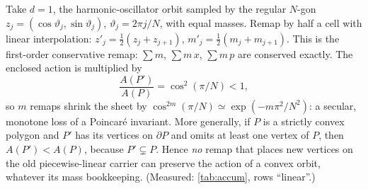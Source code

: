 \begin{counterexample}\label{cex:polygon}
Take $d=1$, the harmonic-oscillator orbit sampled by the regular $N$-gon $z_j=(\cos\vartheta_j,\sin\vartheta_j)$,
$\vartheta_j=2\pi j/N$, with equal masses. Remap by half a cell with linear interpolation:
$z'_j=\tfrac12(z_j+z_{j+1})$, $m'_j=\tfrac12(m_j+m_{j+1})$. This is the first-order conservative remap: $\sum m$,
$\sum m\,x$, $\sum m\,p$ are conserved exactly. The enclosed action is multiplied by
\begin{equation}\label{eq:cos2}
\frac{A(P')}{A(P)}=\cos^2(\pi/N)<1 ,
\end{equation}
so $m$ remaps shrink the sheet by $\cos^{2m}(\pi/N)\simeq\exp(-m\pi^2/N^2)$: a secular, monotone loss of a
Poincar\'e invariant. More generally, if $P$ is a strictly convex polygon and $P'$ has its vertices on $\partial P$
and omits at least one vertex of $P$, then $A(P')<A(P)$, because $P'\subsetneq P$. Hence \emph{no} remap that places
new vertices on the old piecewise-linear carrier can preserve the action of a convex orbit, whatever its mass
bookkeeping. (Measured: \cref{tab:accum}, rows ``linear''.)
\end{counterexample}

